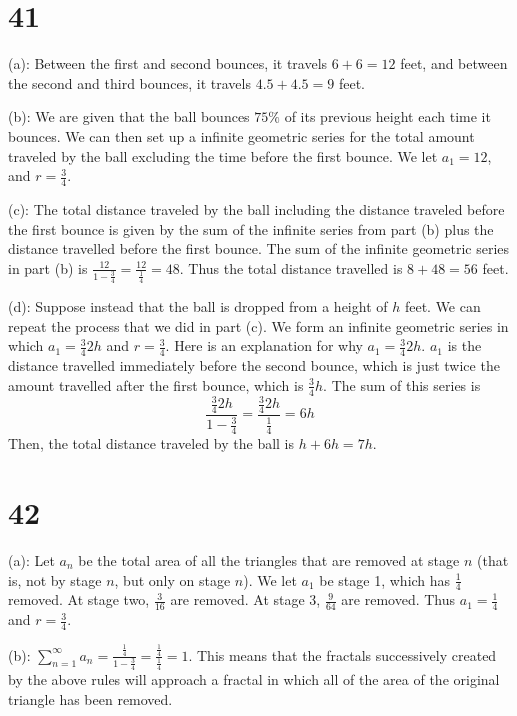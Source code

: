 \documentclass{article}
\theoremstyle{definition}
\newcommand{\?}{\stackrel{?}{=}}
\begin{document}
\section*{41}
(a): Between the first and second bounces, it travels $6+6=12$ feet, and between the second and third bounces, it travels $4.5+4.5=9$ feet.


(b): We are given that the ball bounces $75\%$ of its previous height each time it bounces. We can then set up a infinite geometric series 
for the total amount traveled by the ball excluding the time before the first bounce. We let $a_1=12$, and $r=\frac{3}{4}$.


(c): The total distance traveled by the ball including the distance traveled before the first bounce is given by the sum of the infinite series from part (b) plus the distance travelled 
before the first bounce. The sum of the infinite geometric series in part (b) is $\frac{12}{1-\frac{3}{4}}=\frac{12}{\frac{1}{4}}=48$. Thus the total distance travelled is
$8+48=56$ feet.


(d): Suppose instead that the ball is dropped from a height of $h$ feet. We can repeat the process that we did in part (c). We form an infinite geometric series in which 
$a_1=\frac{3}{4}2h$ and $r=\frac{3}{4}$. Here is an explanation for why $a_1=\frac{3}{4}2h$. $a_1$ is the distance travelled immediately before the second bounce, which is just twice the amount 
travelled after the first bounce, which is $\frac{3}{4}h$. The sum of this series is 
\[ \frac{\frac{3}{4}2h}{1-\frac{3}{4}}=\frac{\frac{3}{4}2h}{\frac{1}{4}}=6h \]
Then, the total distance traveled by the ball is $h+6h=7h$.

\section*{42}
(a): Let $a_n$ be the total area of all the triangles that are removed at stage $n$ (that is, not by stage $n$, but only on stage $n$). 
We let $a_1$ be stage 1, which has $\frac{1}{4}$ removed. At stage two, $\frac{3}{16}$ are removed. At stage 3, $\frac{9}{64}$ are removed. 
Thus $a_1=\frac{1}{4}$ and $r=\frac{3}{4}$.


(b): $\sum_{n=1}^\infty a_n=\frac{\frac{1}{4}}{1-\frac{3}{4}}=\frac{\frac{1}{4}}{\frac{1}{4}}=1$. This means that the fractals successively created by the above rules will approach a 
fractal in which all of the area of the original triangle has been removed. 
\end{document}
